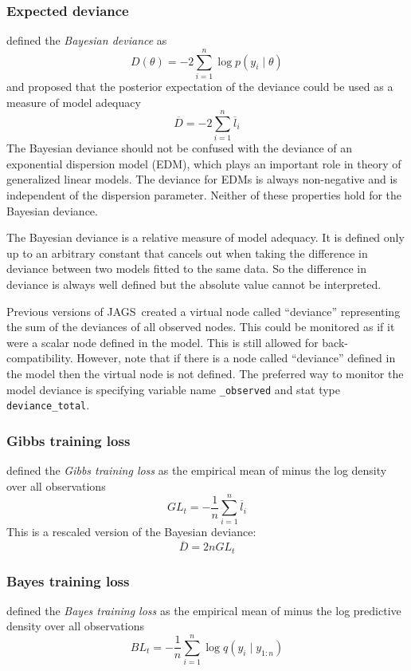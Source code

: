 \documentclass[11pt, a4paper, titlepage]{report}
\newcommand{\JAGS}{\textsf{JAGS}}
\begin{document}
{\subsubsection{Expected deviance}

\citet{spiegelhalter:etal:2002} defined the {\em Bayesian deviance} as
\[
D(\theta) = -2 \sum_{i=1}^n \log p(y_i \mid \theta)
\]
and proposed that the posterior expectation of the deviance could be used
as a measure of model adequacy
\[
\overline{D} = -2 \sum_{i=1}^n \overline{l}_i
\]
The Bayesian deviance should not be confused with the deviance of an
exponential dispersion model (EDM), which plays an important role in
theory of generalized linear models. The deviance for EDMs is always
non-negative and is independent of the dispersion parameter. Neither
of these properties hold for the Bayesian deviance.

The Bayesian deviance is a relative measure of model adequacy. It is
defined only up to an arbitrary constant that cancels out when taking
the difference in deviance between two models fitted to the same
data. So the difference in deviance is always well defined but the
absolute value cannot be interpreted.

Previous versions of \JAGS\ created a virtual node called ``deviance''
representing the sum of the deviances of all observed nodes. This
could be monitored as if it were a scalar node defined in the
model. This is still allowed for back-compatibility. However, note
that if there is a node called ``deviance'' defined in the model then
the virtual node is not defined. The preferred way to monitor the
model deviance is specifying variable name \texttt{\_observed} and
stat type \texttt{deviance\_total}.

\subsubsection{Gibbs training loss}

\citet{Watanabe2009Book} defined the {\em Gibbs training loss} as the
empirical mean of minus the log density over all observations
\[
GL_t = - \frac{1}{n} \sum_{i=1}^n \overline{l}_i
\]
This is a rescaled version of the Bayesian deviance:
\[
\overline{D} = 2 n GL_t
\]

\subsubsection{Bayes training loss}

\citet{Watanabe2009Book} defined the {\em Bayes training loss} as the
empirical mean of minus the log predictive density over all
observations
\[
BL_t = - \frac{1}{n} \sum_{i=1}^n \log q(y_i \mid y_{1:n})
\]

}
\end{document}
